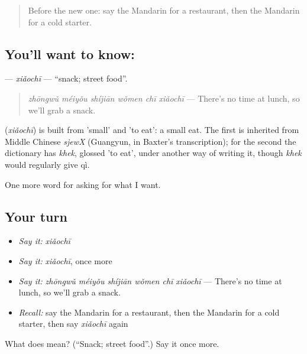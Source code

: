 \label{lesson:ZH-C182-xiaochi}



\begin{quote}
Before the new one: say the Mandarin for a restaurant, then the Mandarin for a cold starter.
\end{quote}

\subsection*{You'll want to know: }
\textbf{} — \emph{xiǎochī} — \textquotedblleft{}snack; street food\textquotedblright{}.

\begin{quote}
\textbf{} \emph{zhōngwǔ méiyǒu shíjiān wǒmen chī xiǎochī} — There's no time at lunch, so we'll grab a snack.
\end{quote}

\begin{cousinweb}
\textbf{} (\emph{xiǎochī}) is built from  'small' and  'to eat': a small eat. The first is inherited from Middle Chinese \emph{sjewX} (Guangyun, in Baxter's transcription); for the second the dictionary has \emph{khek}, glossed 'to eat', under another way of writing it, though \emph{khek} would regularly give qì.
\end{cousinweb}

\begin{grammarlens}[title={What you've built}]
One more word for asking for what I want.
\end{grammarlens}

\subsection*{Your turn}
\begin{itemize}
\raggedright
  \item \emph{Say it:} \emph{xiǎochī}
  \item \emph{Say it:} \emph{xiǎochī}, once more
  \item \emph{Say it:} \emph{zhōngwǔ méiyǒu shíjiān wǒmen chī xiǎochī} — There's no time at lunch, so we'll grab a snack.
  \item \emph{Recall:} say the Mandarin for a restaurant, then the Mandarin for a cold starter, then say \emph{xiǎochī} again
\end{itemize}

\begin{tcolorbox}[breakable,colback=teal!4,colframe=teal!35!black,title={Before you move on}]
What does  mean? (\textquotedblleft{}Snack; street food\textquotedblright{}.) Say it once more.
\end{tcolorbox}

